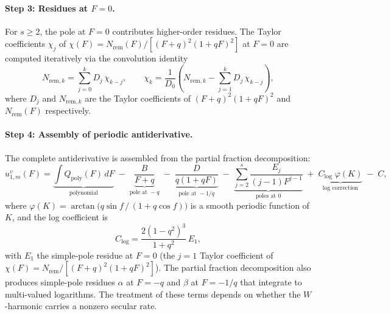 \documentclass[11pt]{article}
\begin{document}
\paragraph{Step 3: Residues at $F = 0$.}
For $s \ge 2$, the pole at $F = 0$ contributes higher-order residues.
The Taylor coefficients $\chi_j$ of
$\chi(F) = N_{\mathrm{rem}}(F) / [(F+q)^2(1+qF)^2]$
at $F = 0$ are computed iteratively via the convolution identity
\begin{equation}
N_{\mathrm{rem},k}
= \sum_{j=0}^{k} D_j \,\chi_{k-j},
\qquad
\chi_k = \frac{1}{D_0}\left(N_{\mathrm{rem},k}
- \sum_{j=1}^{k} D_j\, \chi_{k-j}\right),
\label{eq:taylor_recurrence}
\end{equation}
where $D_j$ and $N_{\mathrm{rem},k}$ are the Taylor coefficients of
$(F+q)^2(1+qF)^2$ and $N_{\mathrm{rem}}(F)$ respectively.

\paragraph{Step 4: Assembly of periodic antiderivative.}
\label{sec:step4}
The complete antiderivative is assembled from the partial fraction
decomposition:
\begin{equation}
u_{1,m}^v(F)
= \underbrace{\int Q_{\mathrm{poly}}(F)\,dF}_{\text{polynomial}}
\;-\;
\underbrace{\frac{B}{F+q}}_{\text{pole at } -q}
\;-\;
\underbrace{\frac{D}{q(1+qF)}}_{\text{pole at } -1/q}
\;-\;
\underbrace{\sum_{j=2}^{s} \frac{E_j}{(j-1)F^{j-1}}}_{\text{poles at } 0}
\;+\;
\underbrace{C_{\log}\;\varphi(K)}_{\text{log correction}}
\;-\; C,
\label{eq:antiderivative_assembly}
\end{equation}
where $\varphi(K) = \arctan\!\bigl(q\sin f\,/\,(1 + q\cos f)\bigr)$
is a smooth periodic function of $K$, and the log coefficient is
\begin{equation}
C_{\log} = \frac{2(1-q^2)^3}{1+q^2}\, E_1,
\label{eq:C_log}
\end{equation}
with $E_1$ the simple-pole residue at $F = 0$ (the $j=1$ Taylor
coefficient of $\chi(F) = N_{\mathrm{rem}}/[(F+q)^2(1+qF)^2]$).
The partial fraction decomposition also produces simple-pole residues
$\alpha$ at $F = -q$ and $\beta$ at $F = -1/q$ that integrate to
multi-valued logarithms.  The treatment of these terms depends on whether
the $W$-harmonic carries a nonzero secular rate.
\end{document}
